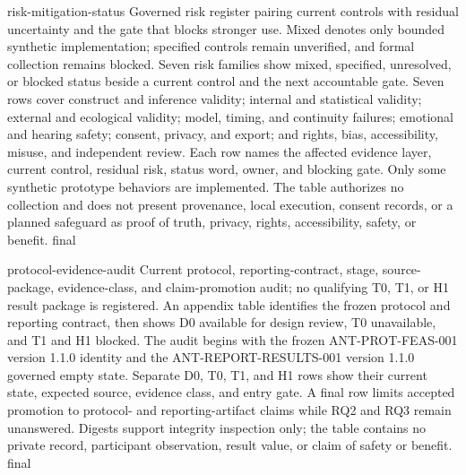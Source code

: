 \AntidoteDeclareVisualText
  {risk-mitigation-status}
  {Governed risk register pairing current controls with residual uncertainty and the gate that blocks stronger use. Mixed denotes only bounded synthetic implementation; specified controls remain unverified, and formal collection remains blocked.}
  {Seven risk families show mixed, specified, unresolved, or blocked status beside a current control and the next accountable gate.}
  {Seven rows cover construct and inference validity; internal and statistical validity; external and ecological validity; model, timing, and continuity failures; emotional and hearing safety; consent, privacy, and export; and rights, bias, accessibility, misuse, and independent review. Each row names the affected evidence layer, current control, residual risk, status word, owner, and blocking gate. Only some synthetic prototype behaviors are implemented. The table authorizes no collection and does not present provenance, local execution, consent records, or a planned safeguard as proof of truth, privacy, rights, accessibility, safety, or benefit.}
  {final}

\AntidoteDeclareVisualText
  {protocol-evidence-audit}
  {Current protocol, reporting-contract, stage, source-package, evidence-class, and claim-promotion audit; no qualifying T0, T1, or H1 result package is registered.}
  {An appendix table identifies the frozen protocol and reporting contract, then shows D0 available for design review, T0 unavailable, and T1 and H1 blocked.}
  {The audit begins with the frozen ANT-PROT-FEAS-001 version 1.1.0 identity and the ANT-REPORT-RESULTS-001 version 1.1.0 governed empty state. Separate D0, T0, T1, and H1 rows show their current state, expected source, evidence class, and entry gate. A final row limits accepted promotion to protocol- and reporting-artifact claims while RQ2 and RQ3 remain unanswered. Digests support integrity inspection only; the table contains no private record, participant observation, result value, or claim of safety or benefit.}
  {final}
